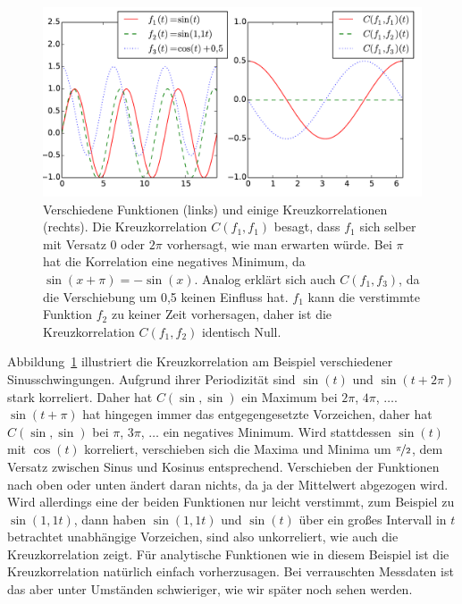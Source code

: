 \begin{figure}
  \centering
  \includegraphics[width=\textwidth]{plots/kreuzkorrelation}
  \caption{Verschiedene Funktionen (links) und einige Kreuzkorrelationen (rechts).
  Die Kreuzkorrelation $C(f_1, f_1)$
  besagt, dass $f_1$ sich selber mit Versatz 0 oder $2\pi$ vorhersagt, wie man
  erwarten würde. Bei $\pi$ hat die Korrelation eine negatives Minimum, da
  $\sin(x + \pi) = -\sin(x)$. Analog erklärt sich auch $C(f_1, f_3)$, da die
  Verschiebung um 0,5 keinen Einfluss hat. $f_1$ kann die verstimmte Funktion
  $f_2$ zu keiner Zeit vorhersagen, daher ist die Kreuzkorrelation $C(f_1, f_2)$
  identisch Null. 
  }
  \label{fig:kreuzkorrelationen}
\end{figure}

Abbildung~\ref{fig:kreuzkorrelationen} illustriert die Kreuzkorrelation am Beispiel
verschiedener Sinusschwingungen. Aufgrund ihrer Periodizität sind $\sin(t)$ und $\sin(t + 2\pi)$ stark korreliert. Daher hat $C(\sin,\sin)$ ein Maximum bei $2\pi$,  $4\pi$, $\ldots$. $\sin(t+\pi)$ hat hingegen immer das entgegengesetzte Vorzeichen, daher hat $C(\sin,\sin)$ bei $\pi$, $3\pi$, $\ldots$ ein negatives Minimum. Wird stattdessen $\sin(t)$ mit $\cos(t)$ korreliert, verschieben sich die Maxima und Minima um $\nicefrac{\pi}{2}$, dem Versatz zwischen Sinus und Kosinus entsprechend. Verschieben der Funktionen nach oben oder unten ändert daran nichts, da ja der Mittelwert abgezogen wird. Wird allerdings eine der beiden Funktionen nur leicht verstimmt, zum Beispiel zu $\sin(1,1 t)$, dann haben $\sin(1,1t)$  und $\sin(t)$ über ein großes Intervall in $t$ betrachtet unabhängige Vorzeichen, sind also unkorreliert, wie auch die Kreuzkorrelation zeigt. Für analytische Funktionen wie in diesem Beispiel ist die Kreuzkorrelation natürlich einfach vorherzusagen. Bei verrauschten Messdaten ist das aber unter Umständen schwieriger, wie wir später noch sehen werden.

